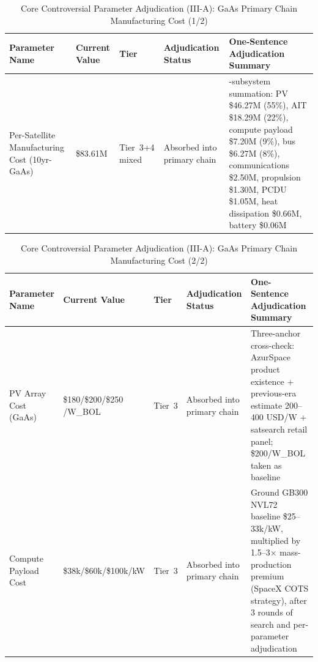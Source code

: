 \clearpage

\begin{table}[H]
  \centering
  \caption{Core Controversial Parameter Adjudication (III-A): GaAs Primary Chain Manufacturing Cost (1/2)}
  \label{tab:core-verdicts-cost-gaas-a}
  \small
  \begin{tabularx}{\textwidth}{
    >{\raggedright\arraybackslash}p{3.0cm}
    >{\raggedright\arraybackslash}p{2.5cm}
    >{\centering\arraybackslash}p{1.5cm}
    >{\raggedright\arraybackslash}p{2.5cm}
    >{\raggedright\arraybackslash}X
  }
  \toprule
  \textbf{Parameter Name} & \textbf{Current Value} & \textbf{Tier} & \textbf{Adjudication Status} & \textbf{One-Sentence Adjudication Summary} \\
  \midrule
  Per-Satellite Manufacturing Cost (10yr-GaAs) & \$83.61M & Tier~3+4 mixed & Absorbed into primary chain & 9-subsystem summation: PV \$46.27M (55\%), AIT \$18.29M (22\%), compute payload \$7.20M (9\%), bus \$6.27M (8\%), communications \$2.50M, propulsion \$1.30M, PCDU \$1.05M, heat dissipation \$0.66M, battery \$0.06M \\
  \bottomrule
  \end{tabularx}
\end{table}

\begin{table}[H]
  \centering
  \caption{Core Controversial Parameter Adjudication (III-A): GaAs Primary Chain Manufacturing Cost (2/2)}
  \label{tab:core-verdicts-cost-gaas-b}
  \small
  \begin{tabularx}{\textwidth}{
    >{\raggedright\arraybackslash}p{3.0cm}
    >{\raggedright\arraybackslash}p{2.5cm}
    >{\centering\arraybackslash}p{1.5cm}
    >{\raggedright\arraybackslash}p{2.5cm}
    >{\raggedright\arraybackslash}X
  }
  \toprule
  \textbf{Parameter Name} & \textbf{Current Value} & \textbf{Tier} & \textbf{Adjudication Status} & \textbf{One-Sentence Adjudication Summary} \\
  \midrule
  PV Array Cost (GaAs) & \$180/\$200/\$250 /W\_BOL & Tier~3 & Absorbed into primary chain & Three-anchor cross-check: AzurSpace product existence + previous-era estimate 200--400 USD/W + satsearch retail panel; \$200/W\_BOL taken as baseline \\
  Compute Payload Cost & \$38k/\$60k/\$100k/kW & Tier~3 & Absorbed into primary chain & Ground GB300 NVL72 baseline \$25--33k/kW, multiplied by 1.5--3$\times$ mass-production premium (SpaceX COTS strategy), after 3 rounds of search and per-parameter adjudication \\
  \bottomrule
  \end{tabularx}
\end{table}

